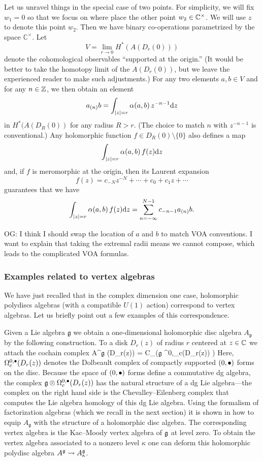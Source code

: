 \documentclass[11pt]{amsart}
\def\C{{\mathbb{C}}}
\def\lie#1{\ensuremath{\mathfrak{#1}}}
\def\owen#1{{\textcolor{violet!50!black}{OG: {#1}}}}
\begin{document}
Let us unravel things in the special case of two points.
For simplicity, we will fix $w_1 = 0$ so that we focus on where place the other point $w_2 \in \mathbb C^\times$.
We will use $z$ to denote this point $w_2$.
Then we have binary co-operations parametrized by the space $\C^\times$.
Let 
\[
V = \lim_{r \to 0} H^*(A(D_r(0)))
\]
denote the cohomological observables ``supported at the origin.''
(It would be better to take the homotopy limit of the $A(D_r(0))$,
but we leave the experienced reader to make such adjustments.)
For any two elements $a, b \in V$ and for any $n \in \mathbb Z$,
we then obtain an element
\[
a_{(n)} b = \int_{|z| = r} \alpha(a,b)\, z^{-n-1} {\rm d} z
\]
in $H^*(A(D_R(0))$ for any radius $R > r$.
(The choice to match $n$ with $z^{-n-1}$ is conventional.)
Any holomorphic function $f \in D_R(0) \setminus \{0\}$ also defines a map
\[
\int_{|z| = r} \alpha(a,b)\, f(z) {\rm d} z 
\]
and, if $f$ is meromorphic at the origin, then its Laurent expansion
\[
f(z) = c_{-N} z^{-N} + \cdots + c_0 + c_1 z + \cdots
\]
guarantees that we have
\[
\int_{|z| = r} \alpha(a,b)\, f(z) {\rm d} z = \sum_{n=-\infty}^{N-1} c_{-n-1} a_{(n)} b.
\]

\owen{I think I should swap the location of $a$ and $b$ to match VOA conventions. I want to explain that taking the extremal radii means we cannot compose, which leads to the complicated VOA formulas.}

\subsubsection{Examples related to vertex algebras} 

We have just recalled that in the complex dimension one case, holomorphic  polydiscs algebras (with a compatible $U(1)$ action) correspond to vertex algebras.
Let us briefly point out a few examples of this correspondence.

Given a Lie algebra $\lie{g}$ we obtain a one-dimensional holomorphic disc algebra $A_{\lie{g}}$ by the following construction. 
To a disk $D_r(z)$ of radius $r$ centered at $z \in \mathbb C$ we attach the cochain complex
\beqn
\label{eqn:diskskm}
A^{\lie{g}} (D_r(z)) = C_\bu \left(\lie{g} \otimes \Omega^{0,\bu}_c(D_r(z)) \right) 
\eeqn
Here, $\Omega^{0,\bullet}_c(D_r(z))$ denotes the Dolbeault complex of compactly supported $(0,\bullet)$ forms on the disc.
Because the space of $(0,\bullet)$ forms define a commutative dg algebra, 
the complex $\lie{g} \otimes \Omega^{0,\bu}_c(D_r(z))$ has the natural structure of a dg Lie algebra---the complex on the right hand side is the Chevalley--Eilenberg complex that computes the Lie algebra homology of this dg Lie algebra.
Using the formalism of factorization algebras (which we recall in the next section) it is shown in \cite{CG2} how to equip $A_{\lie{g}}$ with the structure of a holomorphic disc algebra.
The corresponding vertex algebra is the Kac--Moody vertex algebra of $\mathfrak g$ at level zero. 
To obtain the vertex algebra associated to a nonzero level $\kappa$ one can deform this holomorphic polydisc algebra $A^{\mathfrak g} \rightsquigarrow A^\mathfrak g_{\kappa}$.
\end{document}
